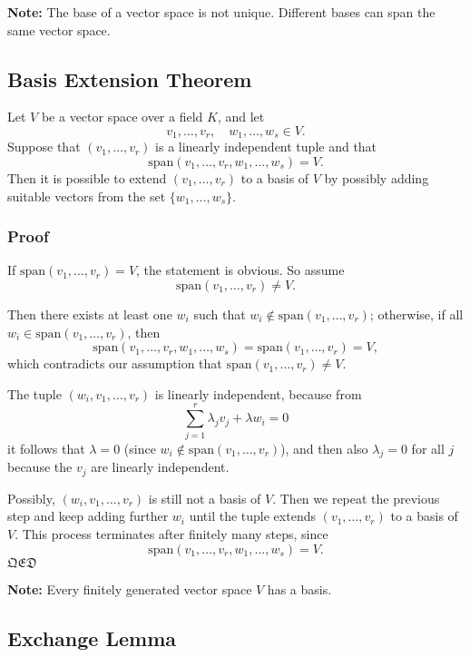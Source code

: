 \noindent\textbf{Note:} The base of a vector space is not unique. Different bases can span the same vector space.

\subsection{Basis Extension Theorem}

Let $V$ be a vector space over a field $K$, and let 
\[
v_1, \ldots, v_r,\quad w_1, \ldots, w_s \in V.
\]
Suppose that $(v_1, \ldots, v_r)$ is a linearly independent tuple and that
\[
\text{span}(v_1, \ldots, v_r, w_1, \ldots, w_s) = V.
\]
Then it is possible to extend $(v_1, \ldots, v_r)$ to a basis of $V$ by possibly adding suitable vectors from the set $\{w_1, \ldots, w_s\}$.

\subsubsection*{Proof}

If $\text{span}(v_1, \ldots, v_r) = V$, the statement is obvious. So assume
\[
\text{span}(v_1, \ldots, v_r) \neq V.
\]

Then there exists at least one $w_i$ such that $w_i \notin \text{span}(v_1, \ldots, v_r)$; otherwise, if all $w_i \in \text{span}(v_1, \ldots, v_r)$, then
\[
\text{span}(v_1, \ldots, v_r, w_1, \ldots, w_s) = \text{span}(v_1, \ldots, v_r) = V,
\]
which contradicts our assumption that $\text{span}(v_1, \ldots, v_r) \neq V$.

The tuple $(w_i, v_1, \ldots, v_r)$ is linearly independent, because from
\[
\sum_{j=1}^r \lambda_j v_j + \lambda w_i = 0
\]
it follows that $\lambda = 0$ (since $w_i \notin \text{span}(v_1, \ldots, v_r)$), and then also $\lambda_j = 0$ for all $j$ because the $v_j$ are linearly independent.

Possibly, $(w_i, v_1, \ldots, v_r)$ is still not a basis of $V$. Then we repeat the previous step and keep adding further $w_i$ until the tuple extends $(v_1, \ldots, v_r)$ to a basis of $V$. This process terminates after finitely many steps, since
\[
\text{span}(v_1, \ldots, v_r, w_1, \ldots, w_s) = V.
\]
$\mathfrak{QED}$

\noindent\textbf{Note:} Every finitely generated vector space $V$ has a basis.

\subsection{Exchange Lemma}

